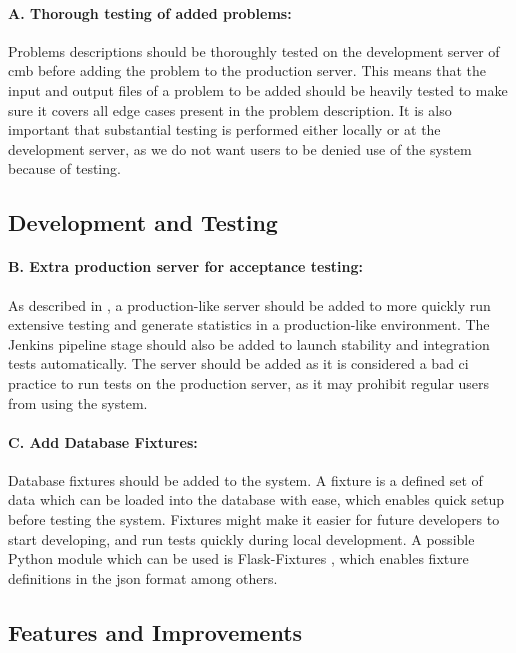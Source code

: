 \paragraph*{A. Thorough testing of added problems:} Problems descriptions should be thoroughly tested on the development server of \gls{cmb} before adding the problem to the production server. This means that the input and output files of a problem to be added should be heavily tested to make sure it covers all edge cases present in the problem description. It is also important that substantial testing is performed either locally or at the development server, as we do not want users to be denied use of the system because of testing.


\subsection*{Development and Testing}
\paragraph*{B. Extra production server for acceptance testing:} As described in , a production-like server should be added to more quickly run extensive testing and generate statistics in a production-like environment. The Jenkins pipeline stage should also be added to launch stability and integration tests automatically. The server should be added as it is considered a bad \gls{ci} practice to run tests on the production server, as it may prohibit regular users from using the system.


\paragraph*{C. Add Database Fixtures:} Database fixtures should be added to the system. A fixture is a defined set of data which can be loaded into the database with ease, which enables quick setup before testing the system. Fixtures might make it easier for future developers to start developing, and run tests quickly during local development. A possible Python module which can be used is Flask-Fixtures \cite{FLASK-FIXTURES}, which enables fixture definitions in the \gls{json} format among others.

\subsection*{Features and Improvements}
